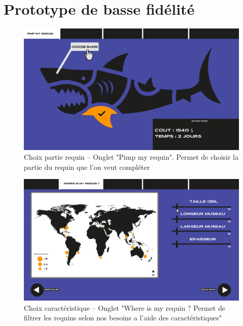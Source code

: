 \documentclass{article}
\begin{document}
\newpage
\section{Prototype de basse fidélité}

\begin{figure}[!h]
	\centering
	\includegraphics[width=14.4cm]{assets/prototype/basse/onglet1}
	\caption{Choix partie requin – Onglet "Pimp my requin". Permet de choisir la partie du requin que l'on veut compléter}
    \label{onglet1} 
\end{figure}

\vspace{0.3cm}

\begin{figure}[!h]
	\centering
	\includegraphics[width=14.4cm]{assets/prototype/basse/onglet2}
	\caption{ Choix caractéristique – Onglet "Where is my requin ? Permet de filtrer les requins selon nos besoins a l'aide des caractéristiques"}
    \label{onglet2}
\end{figure}
\end{document}
